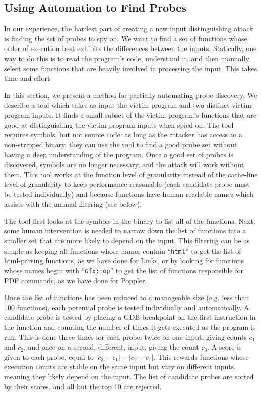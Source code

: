 \documentclass[letterpaper,twocolumn,10pt]{article}
\begin{document}
\subsection{Using Automation to Find Probes}
\label{sec:automate}
\vspace*{-.25em} %

In our experience, the hardest part of creating a new input distinguishing
attack is finding the set of probes to spy on. We want to find a set of
functions whose order of execution best exhibits the differences between the
inputs. Statically, one way to do this is to read the program's code, understand
it, and then manually select some functions that are heavily involved in
processing the input. This takes time and effort. 

In this section, we present a method for partially automating probe discovery.
We describe a tool which takes as input the victim program and two distinct
victim-program inputs. It finds a small subset of the victim program's functions
that are good at distinguishing the victim-program inputs when spied on. The
tool requires symbols, but not source code: as long as the attacker has access
to a non-stripped binary, they can use the tool to find a good probe set without
having a deep understanding of the program. Once a good set of probes is
discovered, symbols are no longer necessary, and the attack will work without
them. This tool works at the function level of granularity instead of the
cache-line level of granularity to keep performance reasonable (each candidate
probe must be tested individually) and because functions have human-readable
names which assists with the manual filtering (see below).

The tool first looks at the symbols in the binary to list all of the
functions. Next, some human intervention is needed to narrow down the list of
functions into a smaller set that are more likely to depend on the input. This
filtering can be as simple as keeping all functions whose names contain
``\texttt{html}'' to get the list of html-parsing functions, as we have done for
Links, or by looking for functions whose names begin with ``\texttt{Gfx::op}''
to get the list of functions responsible for PDF commands, as we have done for
Poppler.

Once the list of functions has been reduced to a manageable size (e.g. less
than 100 functions), each potential probe is tested individually and
automatically. A candidate probe is tested by placing a GDB breakpoint on the
first instruction in the function and counting the number of times it gets
executed as the program is run. This is done three times for each probe: twice
on one input, giving counts $c_1$ and $c_2$, and once on a second, different,
input, giving the count $c_3$. A score is given to each probe, equal to $|c_3
- c_1| - |c_2 - c_1|$. This rewards functions whose execution counts are stable
on the same input but vary on different inputs, meaning they likely depend on
the input. The list of candidate probes are sorted by their scores, and all but
the top 10 are rejected.
\end{document}

